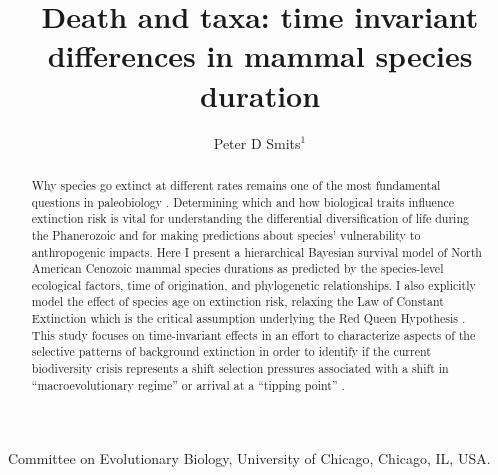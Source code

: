 \documentclass{nature}
\title{Death and taxa: time invariant differences in mammal species duration}
\author{Peter D Smits$^{1}$}
\begin{document}
\maketitle

\begin{affiliations}
\item Committee on Evolutionary Biology, University of Chicago, Chicago, IL, USA.
\end{affiliations}

\begin{abstract}
  Why species go extinct at different rates remains one of the most fundamental questions in paleobiology \cite{Simpson1944,VanValen1973,Raup1994,Quental2013,Wagner2014b}. Determining which and how biological traits influence extinction risk is vital for understanding the differential diversification of life during the Phanerozoic and for making predictions about species' vulnerability to anthropogenic impacts. Here I present a hierarchical Bayesian survival model of North American Cenozoic mammal species durations as predicted by the species-level ecological factors, time of origination, and phylogenetic relationships. I also explicitly model the effect of species age on extinction risk, relaxing the Law of Constant Extinction which is the critical assumption underlying the Red Queen Hypothesis \cite{VanValen1973}. 
  This study focuses on time-invariant effects in an effort to characterize aspects of the selective patterns of background extinction in order to identify if the current biodiversity crisis represents a shift selection pressures associated with a shift in ``macroevolutionary regime'' \cite{Jablonski1986} or arrival at a ``tipping point'' \cite{Barnosky2011,Barnosky2012a}. 
\end{abstract}
\end{document}
